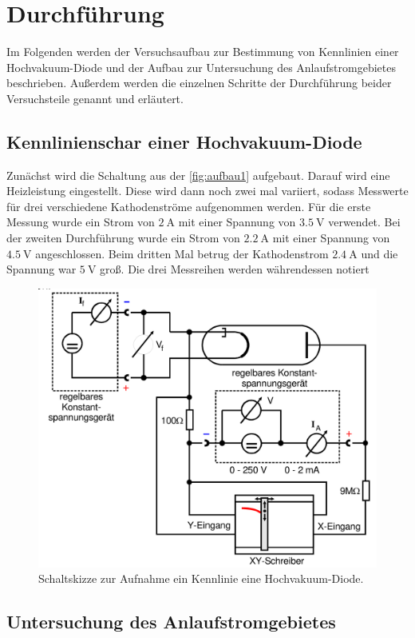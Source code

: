 \section{Durchführung}
\label{sec:durchführung}

Im Folgenden werden der Versuchsaufbau zur Bestimmung von Kennlinien einer Hochvakuum-Diode und der Aufbau zur Untersuchung 
des Anlaufstromgebietes beschrieben. Außerdem werden die einzelnen Schritte der Durchführung beider Versuchsteile genannt und erläutert.

\subsection{Kennlinienschar einer Hochvakuum-Diode}
\label{sec:Kennlinieschar}
 
Zunächst wird die Schaltung aus der \autoref{fig:aufbau1} aufgebaut. Darauf wird eine Heizleistung eingestellt.
Diese wird dann noch zwei mal variiert, sodass Messwerte für drei verschiedene Kathodenströme aufgenommen werden.
Für die erste Messung wurde ein Strom von $\SI{2}{\ampere}$ mit einer Spannung von $\SI{3.5}{\volt}$ verwendet.
Bei der zweiten Durchführung wurde ein Strom von $\SI{2.2}{\ampere}$ mit einer Spannung von $\SI{4.5}{\volt}$ angeschlossen.
Beim dritten Mal betrug der Kathodenstrom $\SI{2.4}{\ampere}$ und die Spannung war $\SI{5}{\volt}$ groß.
Die drei Messreihen werden währendessen notiert

\begin{figure}[H]
    \centering
    \includegraphics[width=0.5\linewidth]{content/grafik/aufbau1.png}
    \caption{Schaltskizze zur Aufnahme ein Kennlinie eine Hochvakuum-Diode.\cite{elektron}}
    \label{fig:aufbau1}
\end{figure}

\subsection{Untersuchung des Anlaufstromgebietes}
\label{sec:Untersuchung des Anlaufstromgebietes}

